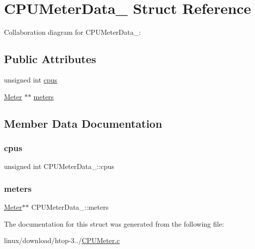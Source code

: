 \hypertarget{structCPUMeterData__}{}\section{C\+P\+U\+Meter\+Data\+\_\+ Struct Reference}
\label{structCPUMeterData__}


Collaboration diagram for C\+P\+U\+Meter\+Data\+\_\+\+:
\subsection*{Public Attributes}
\begin{DoxyCompactItemize}
\item 
unsigned int \hyperlink{structCPUMeterData___a5bf10c8b7aea215e69bd57b5f8f543d4}{cpus}
\item 
\hyperlink{Meter_8h_a36b2163502d1e0b7025c80f102390da2}{Meter} $\ast$$\ast$ \hyperlink{structCPUMeterData___a70fce9f1304121de9542cefef2f3ef0f}{meters}
\end{DoxyCompactItemize}


\subsection{Member Data Documentation}
\mbox{\label{structCPUMeterData___a5bf10c8b7aea215e69bd57b5f8f543d4}} 
\subsubsection{\texorpdfstring{cpus}{cpus}}
{\footnotesize\ttfamily unsigned int C\+P\+U\+Meter\+Data\+\_\+\+::cpus}

\mbox{\label{structCPUMeterData___a70fce9f1304121de9542cefef2f3ef0f}} 
\subsubsection{\texorpdfstring{meters}{meters}}
{\footnotesize\ttfamily \hyperlink{Meter_8h_a36b2163502d1e0b7025c80f102390da2}{Meter}$\ast$$\ast$ C\+P\+U\+Meter\+Data\+\_\+\+::meters}



The documentation for this struct was generated from the following file\+:\begin{DoxyCompactItemize}
\item 
linux/download/htop-\/3../\hyperlink{CPUMeter_8c}{C\+P\+U\+Meter.\+c}\end{DoxyCompactItemize}
